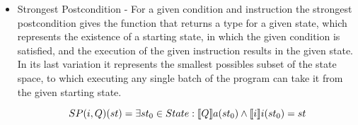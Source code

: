 \begin{itemize}
    \item Strongest Postcondition - For a given condition and instruction the strongest postcondition gives the function that returns a type for a given state, which represents the existence of a starting state, in which the given condition is satisfied, and the execution of the given instruction results in the given state.
    In its last variation it represents the smallest possibles subset of the state space, to which executing any single batch of the program can take it from the given starting state.
    
    \begin{equation}
        SP(i, Q)(st) = \exists st_0 \in State : \llbracket Q \rrbracket a(st_0) \land \llbracket i \rrbracket i(st_0) = st
    \end{equation}
    \begin{code}
        \>[2]\AgdaSpace{}%
        \AgdaSymbol{:}\AgdaSpace{}%
        \AgdaSymbol{(}\AgdaSpace{}%
        \AgdaSpace{}%
        \AgdaSymbol{)}\AgdaSpace{}%
        \AgdaSpace{}%
        \<%
        \\
        \>[2]\AgdaSpace{}%
        \AgdaSymbol{(}\AgdaSpace{}%
        \AgdaOperator{\AgdaInductiveConstructor{,}}\AgdaSpace{}%
        \AgdaSymbol{)}\AgdaSpace{}%
        \AgdaSymbol{=}\AgdaSpace{}%
        \AgdaSpace{}%
        \AgdaSpace{}%
        \AgdaSpace{}%
        \AgdaSpace{}%
        \AgdaSpace{}%
        \AgdaSpace{}%
        \AgdaSpace{}%
        \AgdaSpace{}%
        \AgdaSpace{}%
        \AgdaSpace{}%
        \AgdaSpace{}%
        \AgdaSpace{}%
        \AgdaSpace{}%
        \AgdaSpace{}%
        \AgdaSpace{}%
        \AgdaSpace{}%
        \AgdaSpace{}%
        \AgdaSymbol{)}\<%
        \\
        \\[\AgdaEmptyExtraSkip]%
        \>[2]\AgdaSpace{}%
        \AgdaSymbol{:}\AgdaSpace{}%
        \AgdaSymbol{(}\AgdaSpace{}%

\end{code}
\end{itemize}
